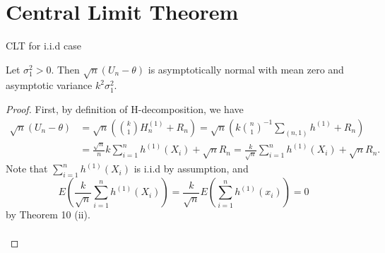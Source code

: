 \documentclass{beamer}
\theoremstyle{definition}
\numberwithin{Def}{section}
\begin{document}
\section{Central Limit Theorem}
\begin{frame}{CLT for i.i.d case}
\begin{fontsize}{7.5}{12}  
\begin{theorem}
    Let $\sigma_1^{2} > 0$. Then $\sqrt{n}(U_n - \theta)$ is asymptotically normal with mean zero and asymptotic variance $k^2 \sigma_1^2$.
    \end{theorem}
    
    \begin{proof}
      First, by definition of H-decomposition, we have 
      \begin{align*}
          \sqrt{n}(U_n - \theta) &= \sqrt{n} \left( {k \choose 1} H_n^{(1)} + R_n \right) 
          = \sqrt{n} \left( k {n \choose 1}^{-1} \sum_{ (n,1) } h^{(1)} + R_n \right) \\
          &= \frac{\sqrt{n}}{n} k \sum_{i = 1}^{n} h^{(1)}(X_i) + \sqrt{n}R_n 
          = \frac{k}{\sqrt{n}} \sum_{i = 1}^{n} h^{(1)}(X_i) + \sqrt{n}R_n.
          \end{align*}
      Note that $\sum_{i = 1}^{n} h^{(1)}(X_i)$ is i.i.d by assumption, and $$ E (\frac{k}{\sqrt{n}} \sum_{i = 1}^{n} h^{(1)}(X_i)) = \frac{k}{\sqrt{n}} E( \sum_{i = 1}^{n}h^{(1)} (x_i) ) = 0$$
      by Theorem 10 (ii). \\
      $\phantom{+}$\\
      $\phantom{+}$\\
      \end{proof}
      \end{fontsize}
      \end{frame}
      
\end{document}
